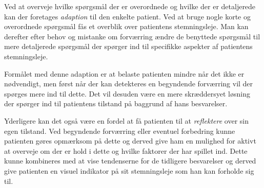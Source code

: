 Ved at overveje hvilke spørgsmål der er overordnede og hvilke der er detaljerede kan der foretages \emph{adaption} til den enkelte patient.
Ved at bruge nogle korte og overordnede spørgsmål fås et overblik over patientens stemningsleje.
Man kan derefter efter behov og mistanke om forværring ændre de benyttede spørgsmål til mere detaljerede spørgsmål der spørger ind til specifikke aspekter af patientens stemningsleje.

Formålet med denne adaption er at belaste patienten mindre når det ikke er nødvendigt, men først når der kan detekteres en begyndende forværring vil der spørges mere ind til dette.
Det vil desuden være en mere skræddersyet løsning der spørger ind til patientens tilstand på baggrund af hans besvarelser.

Yderligere kan det også være en fordel at få patienten til at \emph{reflektere} over sin egen tilstand.
Ved begyndende forværring eller eventuel forbedring kunne patienten gøres opmærksom på dette og derved give ham en mulighed for aktivt at overveje om der er hold i dette og hvilke faktorer der har spillet ind.
Dette kunne kombineres med at vise tendenserne for de tidligere besvarelser og derved give patienten en visuel indikator på sit stemningsleje som han kan forholde sig til.
